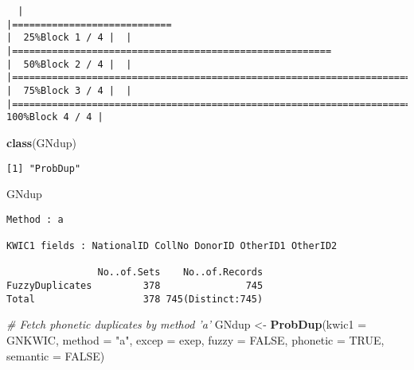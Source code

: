 \documentclass[
]{article}
\newenvironment{Shaded}{\begin{snugshade}}{\end{snugshade}}
\newcommand{\CommentTok}[1]{\textcolor[rgb]{0.56,0.35,0.01}{\textit{#1}}}
\newcommand{\DataTypeTok}[1]{\textcolor[rgb]{0.13,0.29,0.53}{#1}}
\newcommand{\KeywordTok}[1]{\textcolor[rgb]{0.13,0.29,0.53}{\textbf{#1}}}
\newcommand{\NormalTok}[1]{#1}
\newcommand{\OtherTok}[1]{\textcolor[rgb]{0.56,0.35,0.01}{#1}}
\newcommand{\StringTok}[1]{\textcolor[rgb]{0.31,0.60,0.02}{#1}}
\begin{document}
\begin{verbatim}
  |                                                                                                                       |============================                                                                                   |  25%Block 1 / 4 |  |                                                                                                                       |========================================================                                                       |  50%Block 2 / 4 |  |                                                                                                                       |===================================================================================                            |  75%Block 3 / 4 |  |                                                                                                                       |===============================================================================================================| 100%Block 4 / 4 |
\end{verbatim}

\begin{Shaded}
\begin{Highlighting}[]
\KeywordTok{class}\NormalTok{(GNdup)}
\end{Highlighting}
\end{Shaded}

\begin{verbatim}
[1] "ProbDup"
\end{verbatim}

\begin{Shaded}
\begin{Highlighting}[]
\NormalTok{GNdup}
\end{Highlighting}
\end{Shaded}

\begin{verbatim}
Method : a

KWIC1 fields : NationalID CollNo DonorID OtherID1 OtherID2
 
                No..of.Sets    No..of.Records
FuzzyDuplicates         378               745
Total                   378 745(Distinct:745)
\end{verbatim}

\begin{Shaded}
\begin{Highlighting}[]
\CommentTok{# Fetch phonetic duplicates by method 'a'}
\NormalTok{GNdup <-}\StringTok{ }\KeywordTok{ProbDup}\NormalTok{(}\DataTypeTok{kwic1 =}\NormalTok{ GNKWIC, }\DataTypeTok{method =} \StringTok{"a"}\NormalTok{, }\DataTypeTok{excep =}\NormalTok{ exep, }\DataTypeTok{fuzzy =} \OtherTok{FALSE}\NormalTok{,}
                 \DataTypeTok{phonetic =} \OtherTok{TRUE}\NormalTok{, }\DataTypeTok{semantic =} \OtherTok{FALSE}\NormalTok{)}
\end{Highlighting}
\end{Shaded}
\end{document}
